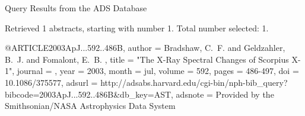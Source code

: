 Query Results from the ADS Database


Retrieved 1 abstracts, starting with number 1.  Total number selected: 1.

@ARTICLE{2003ApJ...592..486B,
   author = {{Bradshaw}, C.~F. and {Geldzahler}, B.~J. and {Fomalont}, E.~B.
	},
    title = "{The X-Ray Spectral Changes of Scorpius X-1}",
  journal = {\apj},
     year = 2003,
    month = jul,
   volume = 592,
    pages = {486-497},
      doi = {10.1086/375577},
   adsurl = {http://adsabs.harvard.edu/cgi-bin/nph-bib_query?bibcode=2003ApJ...592..486B&db_key=AST},
  adsnote = {Provided by the Smithsonian/NASA Astrophysics Data System}
}


